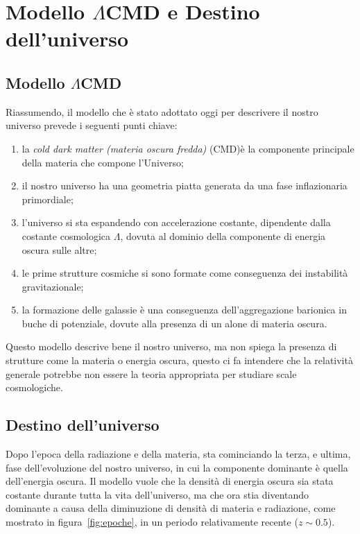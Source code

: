 \section{Modello $\Lambda$CMD e Destino dell'universo}\label{sec:modello-CDM-destino}

\subsection{Modello $\Lambda$CMD}\label{sec:modello-CDM}
Riassumendo, il modello che è stato adottato oggi per descrivere il nostro universo prevede i seguenti punti chiave:
\begin{enumerate}
    \item la \textit{cold dark matter (materia oscura fredda)} (CMD)è la componente principale della materia che compone l'Universo;
    \item il nostro universo ha una geometria piatta generata da una fase inflazionaria primordiale;
    \item l'universo si sta espandendo con accelerazione costante, dipendente dalla costante cosmologica $\Lambda$, dovuta al dominio della componente di energia oscura sulle altre;
    \item le prime strutture cosmiche si sono formate come conseguenza dei instabilità gravitazionale;
    \item la formazione delle galassie è una conseguenza dell'aggregazione barionica in buche di potenziale, dovute alla presenza di un alone di materia oscura.
\end{enumerate}

Questo modello descrive bene il nostro universo, ma non spiega la presenza di strutture come la materia o energia oscura, questo ci fa intendere che la relatività generale potrebbe non essere la teoria appropriata per studiare scale cosmologiche.

\subsection{Destino dell'universo}\label{sec:destino}

Dopo l'epoca della radiazione e della materia, sta cominciando la terza, e ultima, fase dell'evoluzione del nostro universo, in cui la componente dominante è quella dell'energia oscura. Il modello vuole che la densità di energia oscura sia stata costante durante tutta la vita dell'universo, ma che ora stia diventando dominante a causa della diminuzione di densità di materia e radiazione, come mostrato in figura~\ref{fig:epoche}, in un periodo relativamente recente ($z \sim 0.5$).

